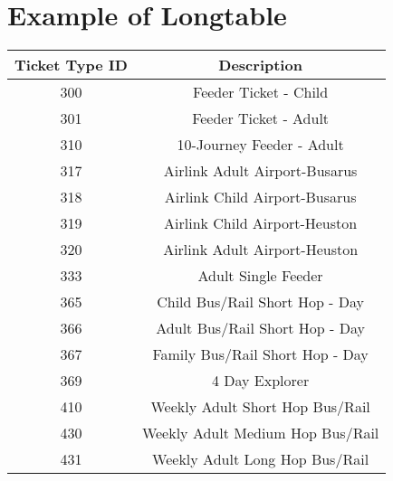 \section{Example of Longtable}\label{app:tickettypes}
\footnotesize{}
\begin{longtable}[htbp]
	{cc} \hline \textbf{Ticket Type ID} & \textbf{Description}     \\\hline \hline \hline
	\endhead

	300                                 &
	Feeder Ticket - Child                                          \\
	\hline 301                          &
	Feeder Ticket - Adult                                          \\
	\hline 310                          &
	10-Journey Feeder - Adult                                      \\
	\hline 317                          &
	Airlink Adult Airport-Busarus                                  \\
	\hline 318                          &
	Airlink Child Airport-Busarus                                  \\
	\hline 319                          &
	Airlink Child Airport-Heuston                                  \\
	\hline 320                          &
	Airlink Adult Airport-Heuston                                  \\
	\hline 333                          &
	Adult Single Feeder                                            \\
	\hline 365                          &
	Child Bus/Rail Short Hop - Day                                 \\
	\hline 366                          &
	Adult Bus/Rail Short Hop - Day                                 \\
	\hline 367                          &
	Family Bus/Rail Short Hop - Day                                \\
	\hline 369                          &
	4 Day Explorer                                                 \\
	\hline 410                          &
	Weekly Adult Short Hop Bus/Rail                                \\
	\hline 430                          &
	Weekly Adult Medium Hop Bus/Rail                               \\
	\hline 431                          &
	Weekly Adult Long Hop Bus/Rail                                 \\

\end{longtable}
